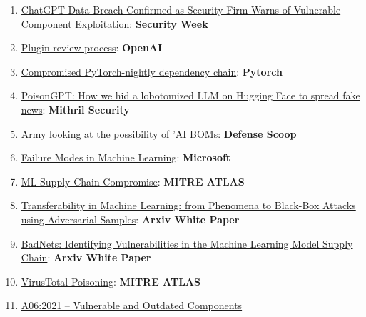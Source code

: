 \documentclass[
]{article}
\providecommand{\tightlist}{%
  \setlength{\itemsep}{0pt}\setlength{\parskip}{0pt}}
\begin{document}
\begin{enumerate}
\def\labelenumi{\arabic{enumi}.}
\tightlist
\item
  \href{https://www.securityweek.com/chatgpt-data-breach-confirmed-as-security-firm-warns-of-vulnerable-component-exploitation/}{ChatGPT
  Data Breach Confirmed as Security Firm Warns of Vulnerable Component
  Exploitation}: \textbf{Security Week}
\item
  \href{https://platform.openai.com/docs/plugins/review}{Plugin review
  process}: \textbf{OpenAI}
\item
  \href{https://pytorch.org/blog/compromised-nightly-dependency/}{Compromised
  PyTorch-nightly dependency chain}: \textbf{Pytorch}
\item
  \href{https://blog.mithrilsecurity.io/poisongpt-how-we-hid-a-lobotomized-llm-on-hugging-face-to-spread-fake-news/}{PoisonGPT:
  How we hid a lobotomized LLM on Hugging Face to spread fake news}:
  \textbf{Mithril Security}
\item
  \href{https://defensescoop.com/2023/05/25/army-looking-at-the-possibility-of-ai-boms-bill-of-materials/}{Army
  looking at the possibility of 'AI BOMs}: \textbf{Defense Scoop}
\item
  \href{https://learn.microsoft.com/en-us/security/engineering/failure-modes-in-machine-learning}{Failure
  Modes in Machine Learning}: \textbf{Microsoft}
\item
  \href{https://atlas.mitre.org/techniques/AML.T0010/}{ML Supply Chain
  Compromise}: \textbf{MITRE ATLAS}
\item
  \href{https://arxiv.org/pdf/1605.07277.pdf}{Transferability in Machine
  Learning: from Phenomena to Black-Box Attacks using Adversarial
  Samples}: \textbf{Arxiv White Paper}
\item
  \href{https://arxiv.org/abs/1708.06733}{BadNets: Identifying
  Vulnerabilities in the Machine Learning Model Supply Chain}:
  \textbf{Arxiv White Paper}
\item
  \href{https://atlas.mitre.org/studies/AML.CS0002}{VirusTotal
  Poisoning}: \textbf{MITRE ATLAS}
\item
  \href{https://owasp.org/Top10/A06_2021-Vulnerable_and_Outdated_Components/}{A06:2021
  -- Vulnerable and Outdated Components}
\end{enumerate}
\end{document}
